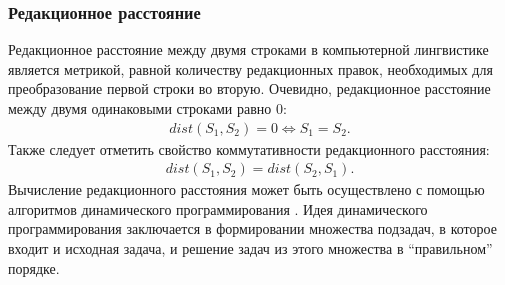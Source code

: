 \subsubsection{Редакционное расстояние}
Редакционное расстояние между двумя строками в компьютерной лингвистике является метрикой, равной количеству редакционных правок, необходимых для преобразование первой строки во вторую. Очевидно, редакционное расстояние между двумя одинаковыми строками равно \(0\):
\begin{align}
	dist(S_1, S_2) = 0 \Leftrightarrow S_1 = S_2\text{.}
\end{align}
Также следует отметить свойство коммутативности редакционного расстояния:
\begin{align}
	dist(S_1, S_2) = dist(S_2, S_1)\text{.}
\end{align}
Вычисление редакционного расстояния может быть осуществлено с помощью алгоритмов динамического программирования \cite{dasgupta}. Идея динамического программирования заключается в формировании множества подзадач, в которое входит и исходная задача, и решение задач из этого множества в ``правильном'' порядке. 

